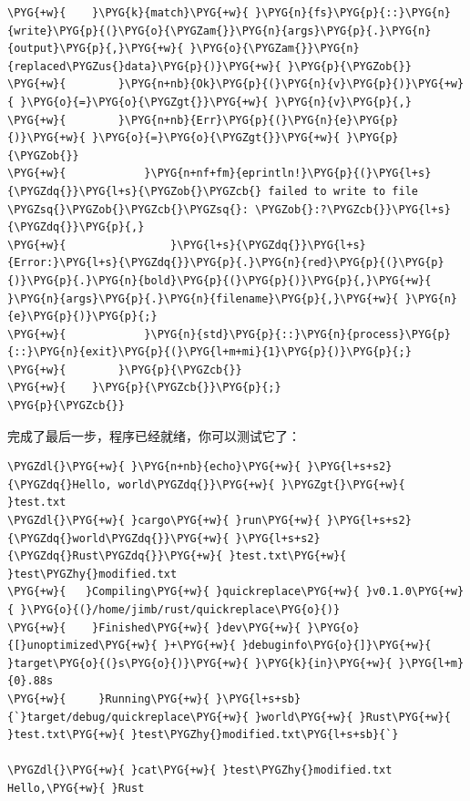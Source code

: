 \begin{Verbatim}[commandchars=\\\{\},breaklines=true,breakanywhere=true,fontsize=\codefont,xleftmargin=17bp]
\PYG{+w}{    }\PYG{k}{match}\PYG{+w}{ }\PYG{n}{fs}\PYG{p}{::}\PYG{n}{write}\PYG{p}{(}\PYG{o}{\PYGZam{}}\PYG{n}{args}\PYG{p}{.}\PYG{n}{output}\PYG{p}{,}\PYG{+w}{ }\PYG{o}{\PYGZam{}}\PYG{n}{replaced\PYGZus{}data}\PYG{p}{)}\PYG{+w}{ }\PYG{p}{\PYGZob{}}
\PYG{+w}{        }\PYG{n+nb}{Ok}\PYG{p}{(}\PYG{n}{v}\PYG{p}{)}\PYG{+w}{ }\PYG{o}{=}\PYG{o}{\PYGZgt{}}\PYG{+w}{ }\PYG{n}{v}\PYG{p}{,}
\PYG{+w}{        }\PYG{n+nb}{Err}\PYG{p}{(}\PYG{n}{e}\PYG{p}{)}\PYG{+w}{ }\PYG{o}{=}\PYG{o}{\PYGZgt{}}\PYG{+w}{ }\PYG{p}{\PYGZob{}}
\PYG{+w}{            }\PYG{n+nf+fm}{eprintln!}\PYG{p}{(}\PYG{l+s}{\PYGZdq{}}\PYG{l+s}{\PYGZob{}\PYGZcb{} failed to write to file \PYGZsq{}\PYGZob{}\PYGZcb{}\PYGZsq{}: \PYGZob{}:?\PYGZcb{}}\PYG{l+s}{\PYGZdq{}}\PYG{p}{,}
\PYG{+w}{                }\PYG{l+s}{\PYGZdq{}}\PYG{l+s}{Error:}\PYG{l+s}{\PYGZdq{}}\PYG{p}{.}\PYG{n}{red}\PYG{p}{(}\PYG{p}{)}\PYG{p}{.}\PYG{n}{bold}\PYG{p}{(}\PYG{p}{)}\PYG{p}{,}\PYG{+w}{ }\PYG{n}{args}\PYG{p}{.}\PYG{n}{filename}\PYG{p}{,}\PYG{+w}{ }\PYG{n}{e}\PYG{p}{)}\PYG{p}{;}
\PYG{+w}{            }\PYG{n}{std}\PYG{p}{::}\PYG{n}{process}\PYG{p}{::}\PYG{n}{exit}\PYG{p}{(}\PYG{l+m+mi}{1}\PYG{p}{)}\PYG{p}{;}
\PYG{+w}{        }\PYG{p}{\PYGZcb{}}
\PYG{+w}{    }\PYG{p}{\PYGZcb{}}\PYG{p}{;}
\PYG{p}{\PYGZcb{}}
\end{Verbatim}

完成了最后一步，程序已经就绪，你可以测试它了：

\begin{Verbatim}[commandchars=\\\{\},breaklines=true,breakanywhere=true,fontsize=\codefont,xleftmargin=17bp]
\PYGZdl{}\PYG{+w}{ }\PYG{n+nb}{echo}\PYG{+w}{ }\PYG{l+s+s2}{\PYGZdq{}Hello, world\PYGZdq{}}\PYG{+w}{ }\PYGZgt{}\PYG{+w}{ }test.txt
\PYGZdl{}\PYG{+w}{ }cargo\PYG{+w}{ }run\PYG{+w}{ }\PYG{l+s+s2}{\PYGZdq{}world\PYGZdq{}}\PYG{+w}{ }\PYG{l+s+s2}{\PYGZdq{}Rust\PYGZdq{}}\PYG{+w}{ }test.txt\PYG{+w}{ }test\PYGZhy{}modified.txt
\PYG{+w}{   }Compiling\PYG{+w}{ }quickreplace\PYG{+w}{ }v0.1.0\PYG{+w}{ }\PYG{o}{(}/home/jimb/rust/quickreplace\PYG{o}{)}
\PYG{+w}{    }Finished\PYG{+w}{ }dev\PYG{+w}{ }\PYG{o}{[}unoptimized\PYG{+w}{ }+\PYG{+w}{ }debuginfo\PYG{o}{]}\PYG{+w}{ }target\PYG{o}{(}s\PYG{o}{)}\PYG{+w}{ }\PYG{k}{in}\PYG{+w}{ }\PYG{l+m}{0}.88s
\PYG{+w}{     }Running\PYG{+w}{ }\PYG{l+s+sb}{`}target/debug/quickreplace\PYG{+w}{ }world\PYG{+w}{ }Rust\PYG{+w}{ }test.txt\PYG{+w}{ }test\PYGZhy{}modified.txt\PYG{l+s+sb}{`}

\PYGZdl{}\PYG{+w}{ }cat\PYG{+w}{ }test\PYGZhy{}modified.txt
Hello,\PYG{+w}{ }Rust
\end{Verbatim}

